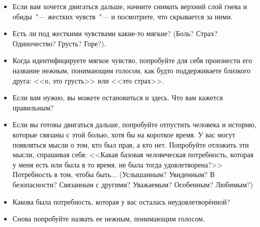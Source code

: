 \vspace{3ex}
 

\vspace{1ex}

\begin{itemize}
	\item Если вам хочется двигаться дальше, начните снимать верхний слой гнева и обиды~"--- жестких чувств~"--- и посмотрите, что скрывается за ними.
	
	\item Есть ли под жесткими чувствами какие-то мягкие? (Боль? Страх? Одиночество? Грусть? Горе?).
	
	\item Когда идентифицируете мягкое чувство, попробуйте для себя произнести его название нежным, понимающим голосом, как будто поддерживаете близкого друга: <<о, это грусть>> или <<это страх>>.
	
	\item Если вам нужно, вы можете остановиться и здесь. Что вам кажется правильным?
\end{itemize}

\newpage
{}

\vspace{1ex}

\begin{itemize}
	\item Если вы готовы двигаться дальше, попробуйте отпустить человека и историю, которые связаны с этой болью, хотя бы на короткое время. У вас могут появляться мысли о том, кто был прав, а кто нет. Попробуйте отложить эти мысли, спрашивая себя: <<Какая базовая человеческая потребность, которая у меня есть или была в то время, не была тогда удовлетворена?>> Потребность в том, чтобы быть... (Услышанным? Увиденным? В безопасности? Связанным с другими? Уважаемым? Особенным? Любимым?)
	
	\item Какова была потребность, которая у вас осталась неудовлетворённой?
	
	\item Снова попробуйте назвать ее нежным, понимающим голосом. 
\end{itemize}

\vspace{3ex}


\vspace{1ex}

